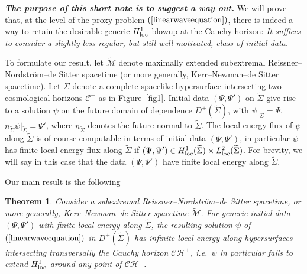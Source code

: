 \documentclass[A4,10pt]{article}
\newtheorem{theorem}{Theorem}[section]
\begin{document}
{\bf \emph{The purpose of this short note is to suggest a way out.}}
We will prove  that, at the level of the proxy
 problem $(\ref{linearwaveequation})$,  there is indeed a way to retain the
 desirable generic
$H^1_{\rm loc}$ blowup at the Cauchy horizon: \emph{It suffices to 
consider a slightly less regular, but still well-motivated, class of initial data.}


To formulate our result, let $\widetilde{\mathcal{M}}$ denote maximally extended subextremal
Reissner--Nordstr\"om--de Sitter spacetime (or more generally,  Kerr--Newman--de Sitter
spacetime). Let $\widetilde\Sigma$ denote a complete spacelike hypersurface intersecting
two  cosmological horizons $\mathcal{C}^+$ as in Figure~\ref{fig1}. 
Initial data $(\Psi, \Psi')$ on $\widetilde\Sigma$ give rise to a solution $\psi$
on the future domain of dependence $D^+(\widetilde\Sigma)$, with $\psi|_{\widetilde{\Sigma}}=
\Psi$, $n_{\widetilde{\Sigma}}\psi|_{\widetilde{\Sigma}}=\Psi'$, where $n_{\widetilde{\Sigma}}$
denotes the future normal to $\widetilde{\Sigma}$.  
The local energy flux of $\psi$ along $\widetilde\Sigma$ is of course computable
in terms of initial data $(\Psi, \Psi')$, in particular $\psi$ has finite local energy flux along
$\widetilde\Sigma$ if $(\Psi,\Psi')\in H^1_{\rm loc}(\widetilde\Sigma)\times
L^2_{\rm loc}(\widetilde\Sigma)$. For brevity, we will say in this case
that the data $(\Psi, \Psi')$ have finite local energy
along $\widetilde{\Sigma}$. 

Our main result is the following
\begin{theorem}
\label{maintheoremINTRO}
Consider a subextremal Reissner--Nordstr\"om--de Sitter spacetime, or more generally,
Kerr--Newman--de Sitter spacetime $\widetilde{\mathcal{M}}$. 
For generic initial data $(\Psi, \Psi')$
with finite local energy along 
$\widetilde{\Sigma}$,  
the resulting solution $\psi$ of $(\ref{linearwaveequation})$
in $D^+(\widetilde{\Sigma})$ 
has infinite local energy along
hypersurfaces intersecting transversally the Cauchy horizon $\mathcal{CH}^+$,
i.e.~$\psi$ in particular fails to extend $H^1_{\rm loc}$ around any point
of $\mathcal{CH}^+$.
\end{theorem}
\end{document}
